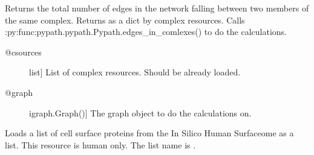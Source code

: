 \documentclass[letterpaper,10pt,english]{sphinxmanual}
\begin{document}
\begin{fulllineitems}
\begin{fulllineitems}
\end{fulllineitems}


\begin{fulllineitems}
\label{\detokenize{main:pypath.main.PyPath.string_effects}}
\end{fulllineitems}


\begin{fulllineitems}
\label{\detokenize{main:pypath.main.PyPath.sum_in_complex}}
Returns the total number of edges in the network falling
between two members of the same complex.
Returns as a dict by complex resources.
Calls :py:func:pypath.pypath.Pypath.edges\_in\_comlexes()
to do the calculations.
\begin{description}
\item[{@csources}] \leavevmode{[}list{]}
List of complex resources. Should be already loaded.

\item[{@graph}] \leavevmode{[}igraph.Graph(){]}
The graph object to do the calculations on.

\end{description}

\end{fulllineitems}


\begin{fulllineitems}
\label{\detokenize{main:pypath.main.PyPath.surfaceome_list}}
Loads a list of cell surface proteins from the In Silico Human
Surfaceome as a list. This resource is human only.
The list name is .

\end{fulllineitems}


\begin{fulllineitems}
\label{\detokenize{main:pypath.main.PyPath.table_latex}}
\end{fulllineitems}


\end{fulllineitems}
\end{document}
